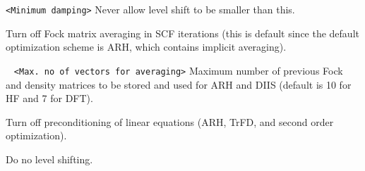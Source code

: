 \begin{description}
\verb|<Minimum damping>|\newline
Never allow level shift to be smaller than this.
\item[\Key{NOAV}] Turn off Fock matrix averaging in SCF iterations (this is default since the default optimization scheme is ARH, which contains implicit averaging).
\item[\Key{NVEC}] \verb| | \newline
\verb|<Max. no of vectors for averaging>|\newline
Maximum number of previous Fock and density matrices to be stored and used for ARH and DIIS (default is 10 for HF and 7 for DFT).
\item[\Key{NOPREC}] Turn off preconditioning of linear equations (ARH, TrFD, and second order optimization).
\item[\Key{NOSHIFT}] Do no level shifting.

\end{description}
